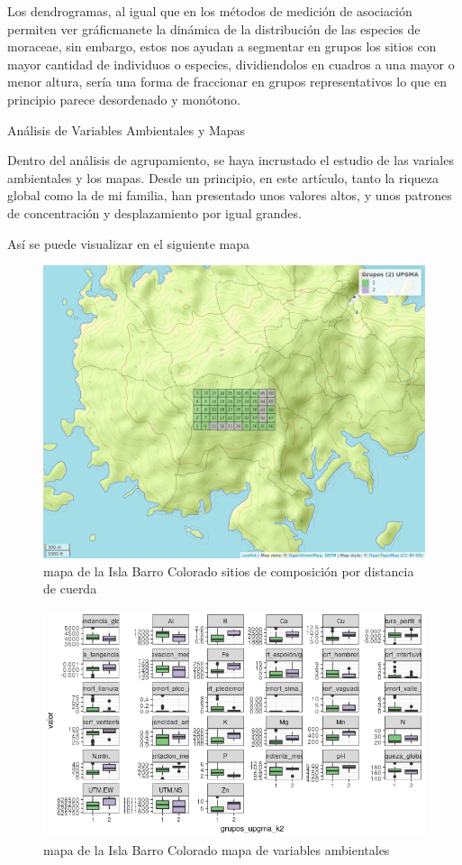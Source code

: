\documentclass[11pt,]{article}
\begin{document}
Los dendrogramas, al igual que en los métodos de medición de asociación
permiten ver gráficmanete la dinámica de la distribución de las especies
de moraceae, sin embargo, estos nos ayudan a segmentar en grupos los
sitios con mayor cantidad de individuos o especies, dividiendolos en
cuadros a una mayor o menor altura, sería una forma de fraccionar en
grupos representativos lo que en principio parece desordenado y
monótono.

Análisis de Variables Ambientales y Mapas

Dentro del análisis de agrupamiento, se haya incrustado el estudio de
las variales ambientales y los mapas. Desde un principio, en este
artículo, tanto la riqueza global como la de mi familia, han presentado
unos valores altos, y unos patrones de concentración y desplazamiento
por igual grandes.

Así se puede visualizar en el siguiente mapa

\begin{figure}
\centering
\includegraphics[width=1.00000\textwidth]{mapa_upgma_k2.png}
\caption{mapa de la Isla Barro Colorado sitios de composición por
distancia de cuerda \label{fig:bci_map}}
\end{figure}

\begin{figure}
\centering
\includegraphics[width=1.00000\textwidth]{mapas_variables_ambientales.png}
\caption{mapa de la Isla Barro Colorado mapa de variables ambientales
\label{fig:bci_map}}
\end{figure}
\end{document}
